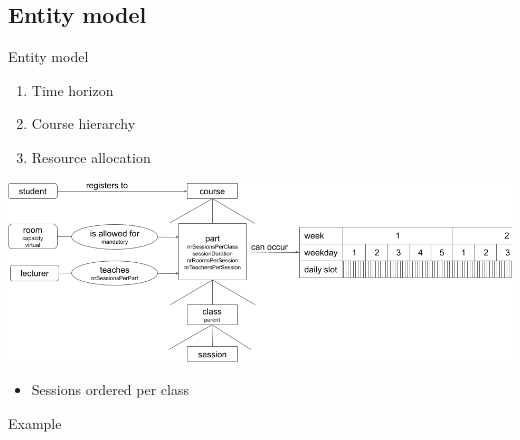 \documentclass{beamer}
\begin{document}
\subsection{Entity model}
\begin{frame}{Entity model}
    \begin{enumerate}
        \item Time horizon
        \item Course hierarchy
        \item Resource allocation
    \end{enumerate}
    \begin{center}
        \includegraphics[width=\textwidth]{img/utp_entity_model.png}
    \end{center}
    \begin{itemize}
        \item Sessions ordered per class
    \end{itemize}
\end{frame}

\begin{frame}{Example}
    \begin{center}
    \end{center}
\end{frame}
\end{document}
